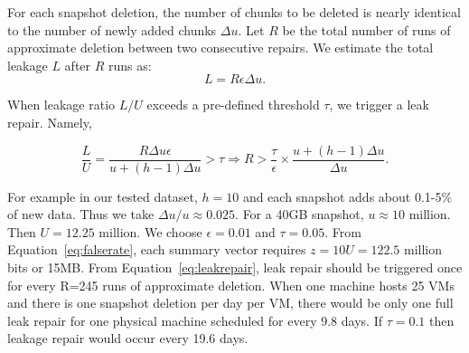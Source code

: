 For each snapshot deletion, the number of chunks to be deleted is nearly identical to the number of
newly added chunks $\Delta u$. 
Let $R$ be the total number of runs of approximate deletion between two consecutive 
repairs. We estimate  the total leakage $L$ after $R$ runs as:
\[
L = R \epsilon \Delta u.
\]

When leakage ratio $L/U$ exceeds a pre-defined threshold $\tau$, we trigger a leak repair. Namely,

\begin{equation}
\label{eq:leakrepair}
\frac{L}{U} = \frac{R \Delta u \epsilon}{u+(h-1)\Delta u } > \tau 
\Longrightarrow R > \frac{\tau}{\epsilon}\times\frac{u + (h-1)\Delta u}{\Delta u}.
\end{equation}

For example in our tested dataset,  
$h=10$ and each snapshot adds
about 0.1-5\% of new data. Thus we take ${\Delta u}/{u} \approx 0.025$. For a 40GB snapshot, $u\approx  10$ million.
Then $U=12.25$ million.
We choose  $\epsilon = 0.01$ and $\tau=0.05$.  From Equation~\ref{eq:falserate}, 
each summary vector requires $z=10U=122.5$ million bits or 15MB. From Equation~\ref{eq:leakrepair}, 
leak repair should be triggered once for every R=245 runs of approximate deletion. 
When one machine hosts 25 VMs and there is one snapshot deletion per day per VM, there would be 
only one full leak repair for one physical machine scheduled for every 9.8 days. 
If $\tau = 0.1$ then leakage repair would occur every 19.6 days.

